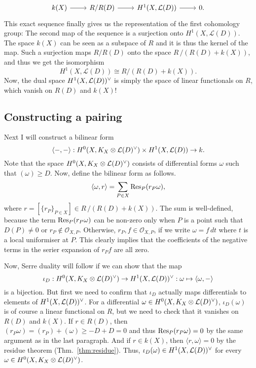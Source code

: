 \[
  \begin{tikzcd}
    k(X)\rar & R/R(D)\rar & H^{1}(X,\mathcal{L}(D))\rar & 0.
  \end{tikzcd}
\]
This exact sequence finally gives us the representation of the first
cohomology group: The second map of the sequence is a surjection
onto $H^{1}(X,\mathcal{L}(D))$. The space $k(X)$ can be seen as a subspace
of $R$ and it is thus the kernel of the map. Such a surjection maps $R/R(D)$
onto the space $R\,/\left(R(D)+k(X)\right)$, and thus we get the isomorphism
\[H^{1}(X,\mathcal{L}(D))\cong R/\left(R(D)+k(X)\right).\]
Now, the dual space $H^1(X,\mathcal{L}(D))^{\vee}$ is simply the space
of linear functionals on $R$, which vanish on $R(D)$ and $k(X)$!

\subsection{Constructing a pairing}
Next I will construct a bilinear form
\[
  \langle -,-\rangle:H^0(X,K_X\otimes\mathcal{L}(D)^{\vee})\times H^{1}(X,\mathcal{L}(D))\to k.
\]
Note that the space $H^0(X,K_X\otimes\mathcal{L}(D)^{\vee})$ consists of differential forms $\omega$
such that $(\omega)\geq D$.
Now, define the bilinear form as follows.
\[
  \langle\omega,r\rangle=\sum_{P\in X}\operatorname{Res}_{P}(r_{P}\omega),
\]
where $r=[\{r_{P}\}_{P\in X}]\in R\,/\left(R(D)+k(X)\right)$. The sum is
well-defined, because the term $\operatorname{Res}_{P}(r_{P}\omega)$ can be non-zero only
when $P$ is a point such that $D(P)\neq 0$ or $r_{P}\not\in\mathscr{O}_{X,P}$.
Otherwise, $r_{P},f\in\mathscr{O}_{X,P}$, if we write $\omega=f\,dt$
where $t$ is a local uniformiser at $P$. This clearly implies that the
coefficients of the negative terms in the serier expansion of $r_{P}f$
are all zero.

Now, Serre duality will follow if we can show that the map
\[
  \iota_{D}:H^0(X,K_X\otimes\mathcal{L}(D)^{\vee})\to H^1(X,\mathcal{L}(D))^{\vee}
  :\omega\mapsto\langle\omega,-\rangle
\]
is a bijection. But first we need to confirm that $\iota_{D}$ actually maps
differentials to elements of $H^1(X,\mathcal{L}(D))^{\vee}$. For a
differential $\omega\in H^0(X,K_X\otimes\mathcal{L}(D)^{\vee})$, $\iota_{D}(\omega)$ is of course a linear
functional on $R$, but we need to check that it vanishes on $R(D)$ and
$k(X)$. If $r\in R(D)$, then $(r_{P}\omega)=(r_{P})+(\omega)\geq -D+D=0$
and thus $\operatorname{Res}_{P}(r_{P}\omega)=0$ by the same argument as in the last
paragraph. And if $r\in k(X)$, then $\langle r,\omega\rangle=0$ by the
residue theorem (Thm.~\ref{thm:residue}). Thus, $\iota_{D}(\omega)\in
H^1(X,\mathcal{L}(D))^{\vee}$ for every $\omega\in H^0(X,K_X\otimes\mathcal{L}(D)^{\vee})$.

